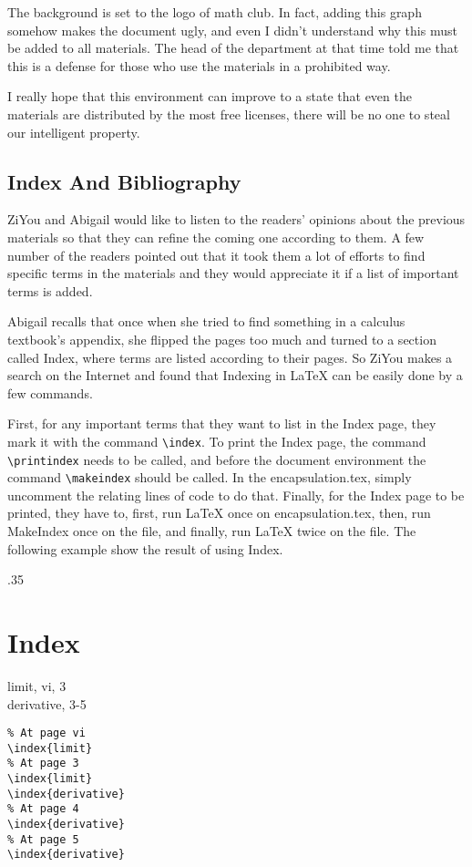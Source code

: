 The background is set to the logo of math club. In fact, adding this graph somehow makes the document ugly, and even I didn't understand why this must be added to all materials. The head of the department at that time told me that this is a defense for those who use the materials in a prohibited way.

I really hope that this environment can improve to a state that even the materials are distributed by the most free licenses, there will be no one to steal our intelligent property.

\subsection{Index And Bibliography}
ZiYou and Abigail would like to listen to the readers' opinions about the previous materials so that they can refine the coming one according to them. A few number of the readers pointed out that it took them a lot of efforts to find specific terms in the materials and they would appreciate it if a list of important terms is added.

Abigail recalls that once when she tried to find something in a calculus textbook's appendix, she flipped the pages too much and turned to a section called Index, where terms are listed according to their pages. So ZiYou makes a search on the Internet and found that Indexing in \LaTeX{} can be easily done by a few commands.

First, for any important terms that they want to list in the Index page, they mark it with the command \verb=\index=. To print the Index page, the command \verb=\printindex= needs to be called, and before the document environment the command \verb=\makeindex= should be called. In the encapsulation.tex, simply uncomment the relating lines of code to do that. Finally, for the Index page to be printed, they have to, first, run \LaTeX{} once on encapsulation.tex, then, run MakeIndex once on the file, and finally, run \LaTeX{} twice on the file. The following example show the result of using Index.
\begin{miniexammar}{.35\textandmarginlen}{
\section*{Index}
limit, vi, 3\\
derivative, 3-5
}
\begin{lstlisting}
% At page vi
\index{limit}
% At page 3
\index{limit}
\index{derivative}
% At page 4
\index{derivative}
% At page 5
\index{derivative}
\end{lstlisting}
\end{miniexammar}


